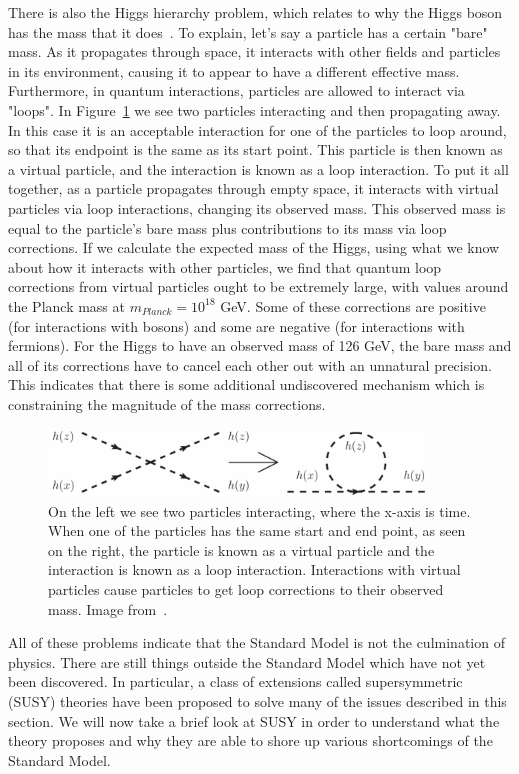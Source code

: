 There is also the Higgs hierarchy problem, which relates to why the Higgs boson has the mass that it does~\cite{SUSY_primer}. To explain, let's say a particle has a certain "bare" mass. As it propagates through space, it interacts with other fields and particles in its environment, causing it to appear to have a different effective mass. Furthermore, in quantum interactions, particles are allowed to interact via "loops". In Figure~\ref{fig:quantum_loops} we see two particles interacting and then propagating away. In this case it is an acceptable interaction for one of the particles to loop around, so that its endpoint is the same as its start point. This particle is then known as a virtual particle, and the interaction is known as a loop interaction. To put it all together, as a particle propagates through empty space, it interacts with virtual particles via loop interactions, changing its observed mass. This observed mass is equal to the particle's bare mass plus contributions to its mass via loop corrections. If we calculate the expected mass of the Higgs, using what we know about how it interacts with other particles, we find that quantum loop corrections from virtual particles ought to be extremely large, with values around the Planck mass at $m_{Planck} = 10^{18}$ GeV. Some of these corrections are positive (for interactions with bosons) and some are negative (for interactions with fermions). For the Higgs to have an observed mass of 126 GeV, the bare mass and all of its corrections have to cancel each other out with an unnatural precision. This indicates that there is some additional undiscovered mechanism which is constraining the magnitude of the mass corrections.

\begin{figure}[htbp]
    \centering
    \includegraphics[width=0.9\textwidth]{Images/Background/loop_correction.png}
    \caption{On the left we see two particles interacting, where the x-axis is time. When one of the particles has the same start and end point, as seen on the right, the particle is known as a virtual particle and the interaction is known as a loop interaction. Interactions with virtual particles cause particles to get loop corrections to their observed mass. Image from~\cite{loop_correction}.}
    \label{fig:quantum_loops}
\end{figure}

All of these problems indicate that the Standard Model is not the culmination of physics. There are still things outside the Standard Model which have not yet been discovered. In particular, a class of extensions called supersymmetric (SUSY) theories have been proposed to solve many of the issues described in this section. We will now take a brief look at SUSY in order to understand what the theory proposes and why they are able to shore up various shortcomings of the Standard Model.